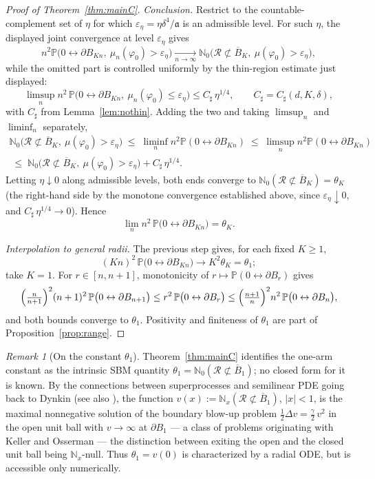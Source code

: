 \documentclass[11pt]{article}
\theoremstyle{definition}
\theoremstyle{remark}
\newtheorem{remark}[theorem]{Remark}
\newcommand{\bP}{\mathbb{P}}
\newcommand{\bN}{{\mathbb{N}_0}}                 %
\newcommand{\Ran}{\mathcal{R}}                 %
\newcommand{\eps}{\varepsilon}
\numberwithin{equation}{section}
\theoremstyle{plain}
\theoremstyle{definition}
\theoremstyle{remark}
\theoremstyle{plain}
\begin{document}
\begin{proof}[Proof of Theorem~\ref{thm:mainC}]
\emph{Conclusion.} Restrict to the countable-complement set of
$\eta$ for which $\eps_\eta=\eta\delta^4/\mathfrak a$ is an admissible level. For
such $\eta$, the displayed joint convergence at level $\eps_\eta$ gives
\[
n^2\bP\bigl(0\leftrightarrow\partial B_{Kn},\ \mu_n(\varphi_0)>\eps_\eta\bigr)
\xrightarrow[n\to\infty]{}\bN\bigl(\Ran\not\subset\overline B_K,\ \mu(\varphi_0)>\eps_\eta\bigr),
\]
while the omitted part is controlled uniformly by the thin-region estimate
just displayed:
\[
\limsup_n n^2\,\bP\bigl(0\leftrightarrow\partial B_{Kn},\ \mu_n(\varphi_0)\le\eps_\eta\bigr)
\le C_\sharp\,\eta^{1/4},\qquad C_\sharp=C_\sharp(d,K,\delta),
\]
with $C_\sharp$ from Lemma~\ref{lem:nothin}.
Adding the two and taking $\limsup_n$ and $\liminf_n$ separately,
\begin{multline*}
\bN\bigl(\Ran\not\subset\overline B_K,\ \mu(\varphi_0)>\eps_\eta\bigr)
\;\le\;\liminf_n n^2\bP(0\leftrightarrow\partial B_{Kn})
\;\le\;\limsup_n n^2\bP(0\leftrightarrow\partial B_{Kn})
\\
\;\le\;\bN\bigl(\Ran\not\subset\overline B_K,\ \mu(\varphi_0)>\eps_\eta\bigr)
+ C_\sharp\,\eta^{1/4}.
\end{multline*}
Letting $\eta\downarrow0$ along admissible levels, both ends converge to
$\bN(\Ran\not\subset\overline B_K)=\theta_K$ (the right-hand side by the monotone
convergence established above, since $\eps_\eta\downarrow0$, and
$C_\sharp\,\eta^{1/4}\to0$). Hence
\[
\lim_n n^2\,\bP\bigl(0\leftrightarrow\partial B_{Kn}\bigr)=\theta_K .
\]

\emph{Interpolation to general radii.} The previous step gives, for
each fixed $K\ge1$,
\[
(Kn)^2\,\bP\bigl(0\leftrightarrow\partial B_{Kn}\bigr)\to K^2\theta_K=\theta_1 ;
\]
take $K=1$. For $r\in[n,n+1]$, monotonicity of
$r\mapsto\bP(0\leftrightarrow\partial B_r)$ gives
\[
\Bigl(\tfrac{n}{n+1}\Bigr)^2 (n+1)^2\,
\bP\bigl(0\leftrightarrow\partial B_{n+1}\bigr)
\le r^2\,\bP\bigl(0\leftrightarrow\partial B_r\bigr)
\le\Bigl(\tfrac{n+1}{n}\Bigr)^2 n^2\,
\bP\bigl(0\leftrightarrow\partial B_{n}\bigr),
\]
and both bounds converge to $\theta_1$. Positivity and finiteness of
$\theta_1$ are part of Proposition~\ref{prop:range}.
\end{proof}

\begin{remark}[On the constant $\theta_1$]
Theorem~\ref{thm:mainC} identifies the one-arm constant as the
intrinsic SBM quantity $\theta_1=\bN(\Ran\not\subset\overline B_1)$; no closed form
for it is known. By the connections between superprocesses and semilinear
PDE going back to Dynkin \cite{Dyn91} (see also \cite[Ch.~VI]{LG99}), the
function $v(x):=\mathbb N_x(\Ran\not\subset\overline B_1)$, $|x|<1$, is the maximal
nonnegative solution of the boundary blow-up problem
$\tfrac12\Delta v=\tfrac\gamma2\,v^2$ in the open unit ball with
$v\to\infty$ at $\partial B_1$ --- a class of problems originating with
Keller \cite{Kel57} and Osserman \cite{Oss57} --- the distinction between
exiting the open and the closed unit ball being $\mathbb N_x$-null. Thus
$\theta_1=v(0)$ is characterized by a radial ODE, but is accessible only
numerically.
\end{remark}
\end{document}
